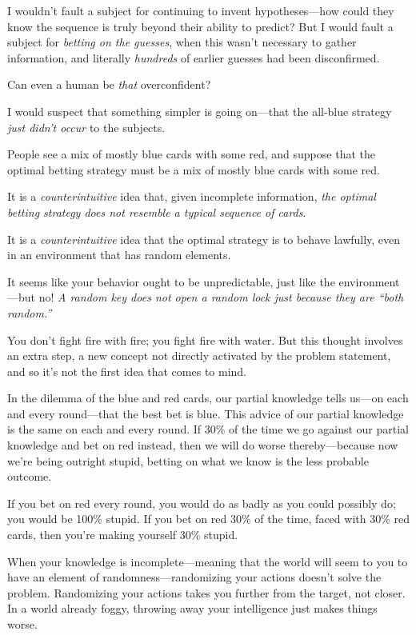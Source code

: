 {
 I wouldn't fault a subject for continuing to
invent hypotheses---how could they know the sequence is truly beyond
their ability to predict? But I would fault a subject for
\textit{betting on the guesses}, when this wasn't
necessary to gather information, and literally \textit{hundreds} of
earlier guesses had been disconfirmed.}

{
 Can even a human be \textit{that} overconfident?}

{
 I would suspect that something simpler is going on---that the
all-blue strategy \textit{just didn't occur} to the
subjects.}

{
 People see a mix of mostly blue cards with some red, and suppose
that the optimal betting strategy must be a mix of mostly blue cards
with some red.}

{
 It is a \textit{counterintuitive} idea that, given incomplete
information, \textit{the optimal betting strategy does not resemble a
typical sequence of cards}.}

{
 It is a \textit{counterintuitive} idea that the optimal strategy
is to behave lawfully, even in an environment that has random
elements.}

{
 It seems like your behavior ought to be unpredictable, just like
the environment---but no! \textit{A random key does not open a random
lock just because they are ``both
random.''}}

{
 You don't fight fire with fire; you fight fire
with water. But this thought involves an extra step, a new concept not
directly activated by the problem statement, and so
it's not the first idea that comes to mind.}

{
 In the dilemma of the blue and red cards, our partial knowledge
tells us---on each and every round---that the best bet is blue. This
advice of our partial knowledge is the same on each and every round. If
30\% of the time we go against our partial knowledge and bet on red
instead, then we will do worse thereby---because now
we're being outright stupid, betting on what we know is
the less probable outcome.}

{
 If you bet on red every round, you would do as badly as you could
possibly do; you would be 100\% stupid. If you bet on red 30\% of the
time, faced with 30\% red cards, then you're making
yourself 30\% stupid.}

{
 When your knowledge is incomplete---meaning that the world will
seem to you to have an element of randomness---randomizing your actions
doesn't solve the problem. Randomizing your actions
takes you further from the target, not closer. In a world already
foggy, throwing away your intelligence just makes things worse.}

